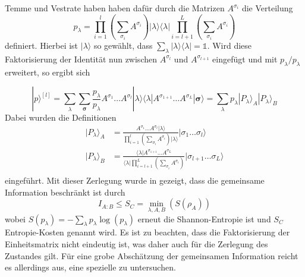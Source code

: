 \documentclass[10pt,a4paper]{report}
\begin{document}
Temme und Vestrate haben \cite{sMPS} haben dafür durch die Matrizen $A^{\sigma_i}$ die Verteilung 
\begin{equation}
p_{\lambda}=\prod_{i=1}^l\left(\sum_{\sigma_i}A^{\sigma_i}\right) |\lambda\rangle\langle\lambda|\prod_{i=l+1}^L\left(\sum_{\sigma_i}A^{\sigma_i}\right)
\end{equation}
definiert. Hierbei ist  $|\lambda\rangle$ so gewählt, dass $\sum_{\lambda}|\lambda\rangle\langle\lambda|=\mathbb{1}$. Wird diese Faktorisierung der Identität nun zwischen $A^{\sigma_l}$ und $A^{\sigma_{l+1}}$ eingefügt und mit $p_{\lambda}/p_{\lambda}$ erweitert, so ergibt sich


\begin{equation}
|p\rangle^{[l]}=\sum_{\lambda}\sum_{\bm{\sigma}}\frac{p_{\lambda}}{p_{\lambda}}A^{\sigma_1}\ldots A^{\sigma_l}|\lambda\rangle\langle\lambda|A^{\sigma_{1+1}}\ldots A^{\sigma_L}|\bm{\sigma}\rangle=\sum_{\lambda}p_{\lambda}|P_{\lambda}\rangle_A|P_{\lambda}\rangle_B
\end{equation}
Dabei wurden die Definitionen
\begin{equation}
\begin{split}
|P_{\lambda}\rangle_A&=\frac{A^{\sigma_1}\ldots A^{\sigma_l}|\lambda\rangle}{\prod_{i=1}^l(\sum_{\sigma_i}A^{\sigma_i})|\lambda\rangle}|\sigma_1\ldots\sigma_l\rangle\\
|P_{\lambda}\rangle_B&=\frac{\langle\lambda|A^{\sigma_{1+1}}\ldots A^{\sigma_L}}{\langle\lambda|\prod_{i=l+1}^L(\sum_{\sigma_i}A^{\sigma_i})}|\sigma_{l+1}\ldots\sigma_L\rangle\\
\end{split}
\end{equation}
eingeführt. Mit dieser Zerlegung wurde in \cite{sMPS} gezeigt, dass die gemeinsame Information beschränkt ist durch
\begin{equation}
I_{A:B}\leq S_C=\min_{\lambda,A,B}(S(\rho_A))
\end{equation}
wobei $S(p_{\lambda})=-\sum_{\lambda}p_{\lambda}\log(p_{\lambda})$ erneut die Shannon-Entropie ist und $S_C$ Entropie-Kosten genannt wird. Es ist zu beachten, dass die Faktorisierung der Einheitsmatrix nicht eindeutig ist, was daher auch für die Zerlegung des Zustandes gilt. Für eine grobe Abschätzung der gemeinsamen Information reicht es allerdings aus, eine spezielle zu untersuchen.
\end{document}

